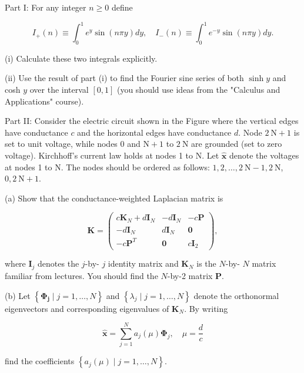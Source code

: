 \documentclass[10pt, a4paper]{article}
\begin{document}
\newpage
\begin{Problem}
Part I: For any integer $n \geq 0$ define

$$
I_{+}(n) \equiv \int_{0}^{1} e^{y} \sin (n \pi y) d y, \quad I_{-}(n) \equiv \int_{0}^{1} e^{-y} \sin (n \pi y) d y .
$$

(i) Calculate these two integrals explicitly.

(ii) Use the result of part (i) to find the Fourier sine series of both $\sinh y$ and cosh $y$ over the interval $[0,1]$ (you should use ideas from the "Calculus and Applications" course).

Part II: Consider the electric circuit shown in the Figure where the vertical edges have conductance $c$ and the horizontal edges have conductance $d$. Node $2 \mathrm{~N}+1$ is set to unit voltage, while nodes 0 and $\mathrm{N}+1$ to $2 \mathrm{~N}$ are grounded (set to zero voltage). Kirchhoff's current law holds at nodes 1 to $\mathrm{N}$. Let $\hat{\mathbf{x}}$ denote the voltages at nodes 1 to $\mathrm{N}$. The nodes should be ordered as follows: $1,2, \ldots, 2 \mathrm{~N}-1,2 \mathrm{~N}$, $0,2 \mathrm{~N}+1$.

(a) Show that the conductance-weighted Laplacian matrix is

$$
\mathbf{K}=\left(\begin{array}{ccc}
c \mathbf{K}_{N}+d \mathbf{I}_{N} & -d \mathbf{I}_{N} & -c \mathbf{P} \\
-d \mathbf{I}_{N} & d \mathbf{I}_{N} & \mathbf{0} \\
-c \mathbf{P}^{T} & \mathbf{0} & c \mathbf{I}_{2}
\end{array}\right),
$$

where $\mathbf{I}_{j}$ denotes the $j$-by- $j$ identity matrix and $\mathbf{K}_{N}$ is the $N$-by- $N$ matrix familiar from lectures. You should find the $N$-by-2 matrix $\mathbf{P}$.

(b) Let $\left\{\boldsymbol{\Phi}_{\mathbf{j}} \mid j=1, \ldots, N\right\}$ and $\left\{\lambda_{j} \mid j=1, \ldots, N\right\}$ denote the orthonormal eigenvectors and corresponding eigenvalues of $\mathbf{K}_{N}$. By writing

$$
\hat{\mathbf{x}}=\sum_{j=1}^{N} a_{j}(\mu) \boldsymbol{\Phi}_{j}, \quad \mu=\frac{d}{c}
$$

find the coefficients $\left\{a_{j}(\mu) \mid j=1, \ldots, N\right\}$.


\end{Problem}
\end{document}
